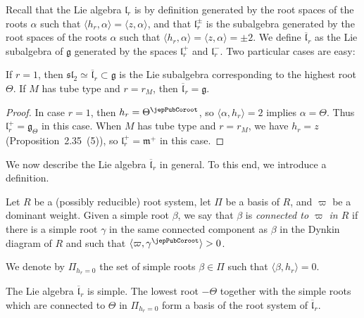 Recall that the Lie algebra $\mathfrak l_r$ is by definition generated by the root spaces of the roots $\alpha$ such that $\langle h_r,\alpha\rangle=\langle z,\alpha\rangle$, and that $\mathfrak l_r^\pm$ is the subalgebra generated by the root spaces of the roots $\alpha$ such that $\langle h_r,\alpha\rangle=\langle z,\alpha\rangle=\pm2$. We define $\overline{\mathfrak l}_r$ as the Lie subalgebra of $\mathfrak g$ generated by the spaces $\mathfrak l_r^+$ and $\mathfrak l_r^-$. Two particular cases are easy:
\begin{fact}
If $r=1$, then $\mathfrak{sl}_2\simeq\overline{\mathfrak l}_r\subset\mathfrak g$ is the Lie subalgebra corresponding to the highest root $\Theta$. If $M$ has tube type and $r=r_M$, then $\overline{\mathfrak l}_r=\mathfrak g$.
\end{fact}
\begin{proof}
In case $r=1$, then $h_r=\Theta^\jepPubCoroot$, so $\langle\alpha,h_r\rangle=2$ implies $\alpha=\Theta$. Thus $\mathfrak l_r^+=\mathfrak g_\Theta$ in this case. When $M$ has tube type and $r=r_M$, we have $h_r=z$ (Proposition~2.35~(5)), so $\mathfrak l_r^+=\mathfrak m^+$ in this case.
\end{proof}
We now describe the Lie algebra $\overline{\mathfrak l}_r$ in general. To this end, we introduce a definition.
\begin{definition}
Let $R$ be a (possibly reducible) root system, let $\Pi$ be a basis of $R$, and $\varpi$ be a dominant weight. Given a simple root $\beta$, we say that $\beta$ is \emph{connected to $\varpi$ in $R$} if there is a simple root $\gamma$ in the same connected component as $\beta$ in the Dynkin diagram of $R$ and such that $\langle\varpi,\gamma^\jepPubCoroot\rangle>0$.
\end{definition}
We denote by $\Pi_{h_r=0}$ the set of simple roots $\beta\in\Pi$ such that $\langle\beta,h_r\rangle=0$.
\begin{lemma}
The Lie algebra $\overline{\mathfrak l}_r$ is simple. The lowest root $-\Theta$ together with the simple roots which are connected to $\Theta$ in $\Pi_{h_r=0}$ form a basis of the root system of $\overline{\mathfrak l}_r$.
\end{lemma}

